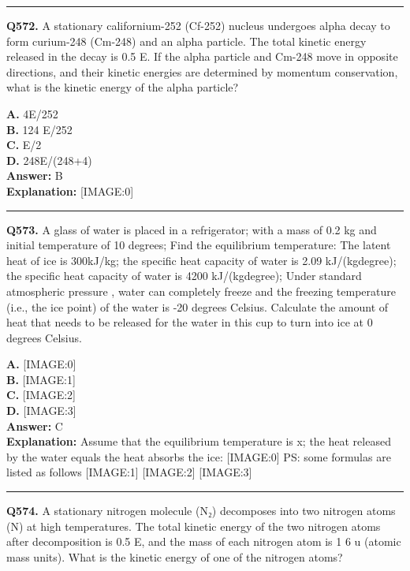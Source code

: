 \documentclass[12pt]{article}
\begin{document}
\hrule
\vspace{1em}


\noindent
\textbf{Q572.} A stationary californium-252 (Cf-252) nucleus undergoes alpha decay to form curium-248 (Cm-248) and an alpha particle. The total kinetic energy released in the decay is
0.5
E. If the alpha particle and Cm-248 move in opposite directions, and their kinetic energies are determined by momentum conservation, what is the kinetic energy of the alpha particle?



\textbf{A.} 4E/252 \\
\textbf{B.} 124
E/252 \\
\textbf{C.} E/2 \\
\textbf{D.} 248E/(248+4) \\

\textbf{Answer:} B \\
\textbf{Explanation:} [IMAGE:0]

\hrule
\vspace{1em}


\noindent
\textbf{Q573.} A glass of water is placed in a refrigerator; with a mass of 0.2 kg and initial temperature of 10 degrees; Find the equilibrium temperature: The latent heat of ice is 300kJ/kg; the specific heat capacity of water is 2.09 kJ/(kg\cdot degree); the specific heat capacity of water is 4200 kJ/(kg\cdot degree); Under standard atmospheric pressure , water can completely freeze and the freezing temperature (i.e., the ice point) of the water is -20 degrees Celsius.
Calculate the amount of heat that needs to be released for the water in this cup to turn into ice at 0 degrees Celsius.



\textbf{A.} [IMAGE:0] \\
\textbf{B.} [IMAGE:1] \\
\textbf{C.} [IMAGE:2] \\
\textbf{D.} [IMAGE:3] \\

\textbf{Answer:} C \\
\textbf{Explanation:} Assume that the equilibrium temperature is x; the heat released by the water equals the heat absorbs the ice:
[IMAGE:0]
PS: some formulas are listed as follows
[IMAGE:1]
[IMAGE:2]
[IMAGE:3]

\hrule
\vspace{1em}


\noindent
\textbf{Q574.} A stationary nitrogen molecule (N₂) decomposes into two nitrogen atoms (N) at high temperatures. The total kinetic energy of the two nitrogen atoms after decomposition is
0.5
E, and the mass of each nitrogen atom is 1
6
u (atomic mass units). What is the kinetic energy of one of the nitrogen atoms?
\end{document}
